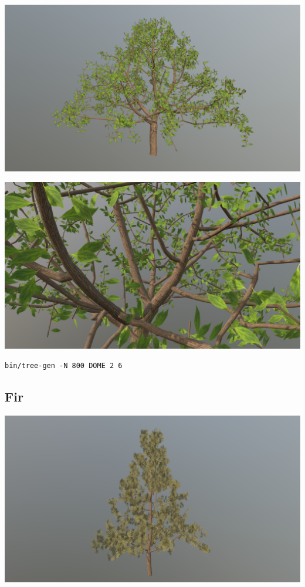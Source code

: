 \documentclass[10pt,a4paper]{article}
\begin{document}
\begin{centering}
\includegraphics[scale=.2]{simple.png}
\end{centering}

\begin{centering}
\includegraphics[scale=.2]{simple_detail.png}
\end{centering}

\texttt{bin/tree-gen -N 800 DOME 2 6}

\subsection{Fir}

\begin{centering}
\includegraphics[scale=.2]{fir.png}
\end{centering}
\end{document}
